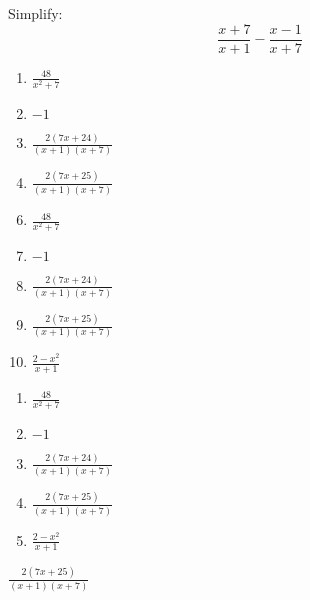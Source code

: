  
Simplify:
$$ \frac{x+7}{x+1}-\frac{x-1}{x+7} $$


\ifsat
	\begin{enumerate}[label=\Alph*)]
		\item {\Large $\frac{48}{x^2+7}  $ }
		\item $-1$
		\item {\Large$\frac{2(7x+24)}{(x+1)(x+7)}  $}
		\item {\Large$\frac{2(7x+25)}{(x+1)(x+7)} $} %
	\end{enumerate}
\else
\fi

\ifacteven
	\begin{enumerate}[label=\textbf{\Alph*.},itemsep=\fill,align=left]
		\setcounter{enumii}{5}
		\item {\Large $\frac{48}{x^2+7}  $ }
		\item $-1$
		\item {\Large$\frac{2(7x+24)}{(x+1)(x+7)}  $}
		\addtocounter{enumii}{1}
		\item {\Large$\frac{2(7x+25)}{(x+1)(x+7)} $} %
		\item {\Large$\frac{2-x^2}{x+1}$}
	\end{enumerate}
\else
\fi

\ifactodd
	\begin{enumerate}[label=\textbf{\Alph*.},itemsep=\fill,align=left]
		\item {\Large $\frac{48}{x^2+7}  $ }
		\item $-1$
		\item {\Large$\frac{2(7x+24)}{(x+1)(x+7)}  $}
		\item {\Large$\frac{2(7x+25)}{(x+1)(x+7)} $} %
		\item {\Large$\frac{2-x^2}{x+1}$}
	\end{enumerate}
\else
\fi

\ifgridin
 {\Large$\frac{2(7x+25)}{(x+1)(x+7)} $} %

\else
\fi

